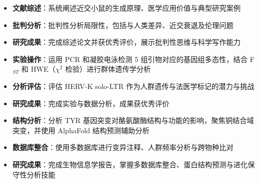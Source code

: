 \documentclass{my-resume}
\begin{document}
\begin{itemize}[parsep=0.2ex]
  \item \textbf{文献综述}：系统阐述近交小鼠的生成原理、医学应用价值与典型研究案例
  \item \textbf{批判分析}：批判性分析局限性，包括与人类差异、近交衰退及伦理问题
  \item \textbf{研究成果}：完成综述论文并获优秀评价，展示批判性思维与科学写作能力
\end{itemize}

\begin{itemize}[parsep=0.2ex]
  \item \textbf{实验操作}：运用 PCR 和凝胶电泳检测 5 组引物对应的基因组多态性，结合 F$_{ST}$ 和 HWE（$\chi^2$ 检验）进行群体遗传学分析
  \item \textbf{分析评估}：评估 HERV-K solo-LTR 作为人群遗传与法医学标记的潜力与挑战
  \item \textbf{研究成果}：完成实验与数据分析，成果获优秀评价
\end{itemize}

\begin{itemize}[parsep=0.2ex]
  \item \textbf{结构分析}：分析 TYR 基因突变对酪氨酸酶结构与功能的影响，聚焦铜结合域突变，并使用 AlphaFold 结构预测辅助分析
  \item \textbf{数据库整合}：使用多数据库进行变异注释、人群频率分析与跨物种比对
  \item \textbf{研究成果}：完成生物信息学报告，掌握多数据库整合、蛋白结构预测与进化保守性分析技能
\end{itemize}
\end{document}
